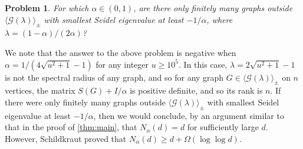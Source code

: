 \documentclass[11pt]{article}
\newtheorem{problem}[theorem]{Problem}
\theoremstyle{definition}
\theoremstyle{remark}
\newcommand{\G}{\mathcal{G}}
\newcommand{\gen}[1]{\langle #1 \rangle_\pm}
\begin{document}
\begin{problem}
    For which $\alpha \in (0,1)$, are there only finitely many graphs outside $\gen{\G(\lambda)}$ with smallest Seidel eigenvalue at least $-1/\alpha$, where $\lambda = (1-\alpha)/(2\alpha)$?
\end{problem}

We note that the answer to the above problem is negative when $\alpha = 1/(4\sqrt{u^2+1}-1)$ for any integer $u \ge 10^5$. In this case, $\lambda = 2\sqrt{u^2+1}-1$ is not the spectral radius of any graph, and so for any graph $G \in \gen{\G(\lambda)}$ on $n$ vertices, the matrix $S(G) + I/\alpha$ is positive definite, and so its rank is $n$. If there were only finitely many graphs outside $\gen{\G(\lambda)}$ with smallest Seidel eigenvalue at least $-1/\alpha$, then we would conclude, by an argument similar to that in the proof of \cref{thm:main}, that $N_\alpha(d) = d$ for sufficiently large $d$. However, Schildkraut \cite[Theorem~1.4]{S23} proved that $N_\alpha(d) \ge d + \Omega(\log\log d)$.




\end{document}
